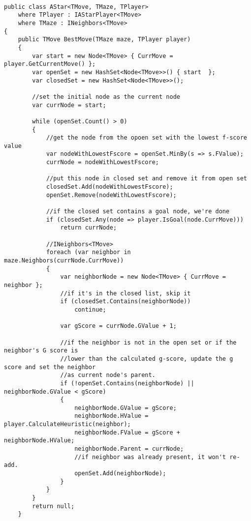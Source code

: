 \begin{lstlisting}

public class AStar<TMove, TMaze, TPlayer>
    where TPlayer : IAStarPlayer<TMove>
    where TMaze : INeighbors<TMove>
{
    public TMove BestMove(TMaze maze, TPlayer player)
    {
        var start = new Node<TMove> { CurrMove = player.GetCurrentMove() };
        var openSet = new HashSet<Node<TMove>>() { start  };
        var closedSet = new HashSet<Node<TMove>>();

        //set the initial node as the current node
        var currNode = start;

        while (openSet.Count() > 0)
        {
            //get the node from the opoen set with the lowest f-score value
            var nodeWithLowestFscore = openSet.MinBy(s => s.FValue);
            currNode = nodeWithLowestFscore;

            //put this node in closed set and remove it from open set
            closedSet.Add(nodeWithLowestFscore);
            openSet.Remove(nodeWithLowestFscore);

            //if the closed set contains a goal node, we're done
            if (closedSet.Any(node => player.IsGoal(node.CurrMove)))
                return currNode;

            //INeighbors<TMove>
            foreach (var neighbor in maze.Neighbors(currNode.CurrMove))
            {
                var neighborNode = new Node<TMove> { CurrMove = neighbor };
                //if it's in the closed list, skip it
                if (closedSet.Contains(neighborNode))
                    continue;

                var gScore = currNode.GValue + 1;

                //if the neighbor is not in the open set or if the neighbor's G score is
                //lower than the calculated g-score, update the g score and set the neighbor
                //as current node's parent.
                if (!openSet.Contains(neighborNode) || neighborNode.GValue < gScore)
                {
                    neighborNode.GValue = gScore;
                    neighborNode.HValue = player.CalculateHeuristic(neighbor);
                    neighborNode.FValue = gScore + neighborNode.HValue;
                    neighborNode.Parent = currNode;
                    //if neighbor was already present, it won't re-add.
                    openSet.Add(neighborNode);
                }
            }
        }
        return null;
    }

\end{lstlisting}


